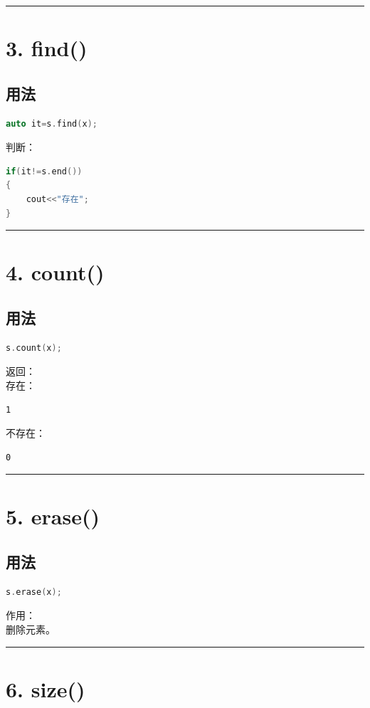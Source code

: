 \documentclass[10pt,twocolumn]{extarticle}
\begin{document}
\noindent\rule{\linewidth}{0.4pt}

\section{3. find()}

\subsection{用法}
\begin{lstlisting}[language=C++]
auto it=s.find(x);
\end{lstlisting}
判断：
\begin{lstlisting}[language=C++]
if(it!=s.end())
{
    cout<<"存在";
}
\end{lstlisting}

\noindent\rule{\linewidth}{0.4pt}

\section{4. count()}

\subsection{用法}
\begin{lstlisting}[language=C++]
s.count(x);
\end{lstlisting}
返回：\\
存在：
\begin{lstlisting}
1
\end{lstlisting}
不存在：
\begin{lstlisting}
0
\end{lstlisting}

\noindent\rule{\linewidth}{0.4pt}

\section{5. erase()}

\subsection{用法}
\begin{lstlisting}[language=C++]
s.erase(x);
\end{lstlisting}
作用：\\
删除元素。

\noindent\rule{\linewidth}{0.4pt}

\section{6. size()}
\end{document}
